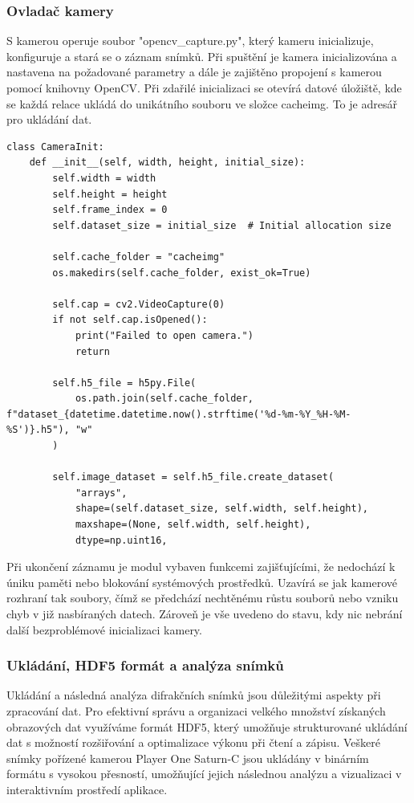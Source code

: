 \documentclass{article}
\begin{document}
\subsubsection{Ovladač kamery}
S kamerou operuje soubor "opencv\_capture.py", který kameru inicializuje, konfiguruje a stará se o záznam snímků. Při spuštění je kamera inicializována a nastavena na požadované parametry a dále je zajištěno propojení s kamerou pomocí knihovny OpenCV. Při zdařilé inicializaci se otevírá datové úložiště, kde se každá relace ukládá do unikátního souboru ve složce cacheimg. To je adresář pro ukládání dat.\\

\begin{lstlisting}
class CameraInit:
    def __init__(self, width, height, initial_size):
        self.width = width
        self.height = height
        self.frame_index = 0
        self.dataset_size = initial_size  # Initial allocation size
        
        self.cache_folder = "cacheimg"
        os.makedirs(self.cache_folder, exist_ok=True)
        
        self.cap = cv2.VideoCapture(0)
        if not self.cap.isOpened():
            print("Failed to open camera.")
            return
        
        self.h5_file = h5py.File(
            os.path.join(self.cache_folder, f"dataset_{datetime.datetime.now().strftime('%d-%m-%Y_%H-%M-%S')}.h5"), "w"
        )

        self.image_dataset = self.h5_file.create_dataset(
            "arrays",
            shape=(self.dataset_size, self.width, self.height),
            maxshape=(None, self.width, self.height),
            dtype=np.uint16,
\end{lstlisting}
\vspace{0.5cm}

Při ukončení záznamu je modul vybaven funkcemi zajišťujícími, že nedochází k úniku paměti nebo blokování systémových prostředků. Uzavírá se jak kamerové rozhraní tak soubory, čímž se předchází nechtěnému růstu souborů nebo vzniku chyb v již nasbíraných datech. Zároveň je vše uvedeno do stavu, kdy nic nebrání další bezproblémové inicializaci kamery.


\subsubsection{Ukládání, HDF5 formát a analýza snímků}
Ukládání a následná analýza difrakčních snímků jsou důležitými aspekty při zpracování dat. Pro efektivní správu a organizaci velkého množství získaných obrazových dat využíváme formát HDF5, který umožňuje strukturované ukládání dat s možností rozšiřování a optimalizace výkonu při čtení a zápisu. Veškeré snímky pořízené kamerou Player One Saturn-C jsou ukládány v binárním formátu s vysokou přesností, umožňující jejich následnou analýzu a vizualizaci v interaktivním prostředí aplikace.\\
\end{document}
